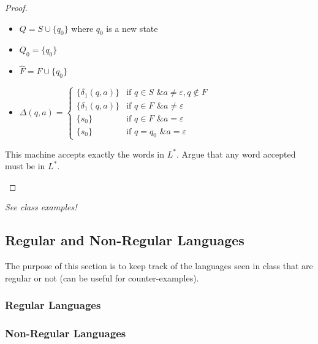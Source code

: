 \documentclass{article}
\begin{document}
\begin{proof}
\begin{enumerate}
    \begin{itemize}
        \item $Q = S \cup \{q_0\}$ where $q_0$ is a new state
        \item $Q_0 = \{q_0\}$
        \item $\hat{F} = F \cup \{q_0\}$
        \item $\Delta(q,a) = 
        \begin{cases} 
        \{\delta_1(q,a)\} & \text{if } q \in S \text{ \& } a \ne \varepsilon, q \notin F\\
        \{\delta_1(q,a)\} & \text{if } q \in F \text{ \& } a \ne \varepsilon\\
        \{s_0\} & \text{if } q \in F  \text{ \& } a = \varepsilon\\
        \{s_0\} & \text{if } q = q_0 \text{ \& } a = \varepsilon
        \end{cases}$
    \end{itemize}
    This machine accepts exactly the words in $L^*$. Argue that any word accepted must be in $L^*$.
\end{enumerate}
\end{proof}
\noindent\textit{See class examples!}
\subsection{Regular and Non-Regular Languages}
The purpose of this section is to keep track of the languages seen in class that are regular or not (can be useful for counter-examples).
\subsubsection{Regular Languages}
\subsubsection{Non-Regular Languages}
\end{document}
